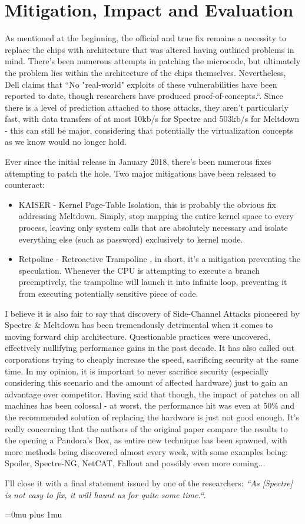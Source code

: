 \documentclass{article}
\begin{document}
\section{Mitigation, Impact and Evaluation}
As mentioned at the beginning, the official and true fix remains a necessity to replace the chips with architecture that was altered having outlined problems in mind. There's been numerous attempts in patching the microcode, but ultimately the problem lies within the architecture of the chips themselves. Nevertheless, Dell claims that ``No "real-world" exploits of these vulnerabilities have been reported to date, though researchers have produced proof-of-concepts.``\cite{dell}. Since there is a level of prediction attached to those attacks, they aren't particularly fast, with data transfers of at most 10kb/s for Spectre and 503kb/s for Meltdown \cite{kocher2018spectre}\cite{lipp2018meltdown} - this can still be major, considering that potentially the virtualization concepts as we know would no longer hold.

Ever since the initial release in January 2018, there's been numerous fixes attempting to patch the hole. Two major mitigations have been released to counteract:
\begin{itemize}
  \item KAISER \cite{lipp2018meltdown} - Kernel Page-Table Isolation, this is probably the obvious fix addressing Meltdown. Simply, stop mapping the entire kernel space to every process, leaving only system calls that are absolutely necessary and isolate everything else (such as password) exclusively to kernel mode.
  \item Retpoline - Retroactive Trampoline \cite{turner2018retpoline}, in short, it's a mitigation preventing the speculation. Whenever the CPU is attempting to execute a branch preemptively, the trampoline will launch it into infinite loop, preventing it from executing potentially sensitive piece of code.
\end{itemize}

I believe it is also fair to say that discovery of Side-Channel Attacks pioneered by Spectre \& Meltdown has been tremendously detrimental when it comes to moving forward chip architecture. Questionable practices were uncovered, effectively nullifying performance gains in the past decade. It has also called out corporations trying to cheaply increase the speed, sacrificing security at the same time. In my opinion, it is important to never sacrifice security (especially considering this scenario and the amount of affected hardware) just to gain an advantage over competitor. Having said that though, the impact of patches on all machines has been colossal - at worst, the performance hit was even at 50\% \cite{prout2018measuring} and the recommended solution of replacing the hardware is just not good enough. It's really concerning that the authors of the original paper compare the results to the opening a Pandora's Box, as entire new technique has been spawned, with more methods being discovered almost every week, with some examples being: Spoiler, Spectre-NG, NetCAT, Fallout\cite{fallout} and possibly even more coming...

I'll close it with a final statement issued by one of the researchers: \textit{``As [Spectre] is not easy to fix, it will haunt us for quite some time.``}. 

\Urlmuskip=0mu plus 1mu\relax


 
\end{document}
